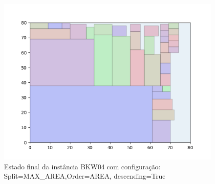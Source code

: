 \begin{figure}[H]
    \centering
    \caption[]{Estado final da instância BKW04 com configuração: Split=MAX_AREA,Order=AREA, descending=True}
    \label{fig:bkw04-max_area-area-true}
    \includegraphics[scale=0.5]{output/figures/bkw/bkw04/max_area/area/true/00}
\end{figure}